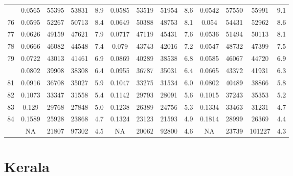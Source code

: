 \documentclass[
  14pt,
]{article}
\begin{document}
\begin{longtable}[t]{lcccccccccccc}
\addlinespace
75 & 0.0565 & 55395 & 53831 & 8.9 & 0.0585 & 53519 & 51954 & 8.6 & 0.0542 & 57550 & 55991 & 9.1\\
76 & 0.0595 & 52267 & 50713 & 8.4 & 0.0649 & 50388 & 48753 & 8.1 & 0.054 & 54431 & 52962 & 8.6\\
77 & 0.0626 & 49159 & 47621 & 7.9 & 0.0717 & 47119 & 45431 & 7.6 & 0.0536 & 51494 & 50113 & 8.1\\
78 & 0.0666 & 46082 & 44548 & 7.4 & 0.079 & 43743 & 42016 & 7.2 & 0.0547 & 48732 & 47399 & 7.5\\
79 & 0.0722 & 43013 & 41461 & 6.9 & 0.0869 & 40289 & 38538 & 6.8 & 0.0585 & 46067 & 44720 & 6.9\\
\addlinespace
80 & 0.0802 & 39908 & 38308 & 6.4 & 0.0955 & 36787 & 35031 & 6.4 & 0.0665 & 43372 & 41931 & 6.3\\
81 & 0.0916 & 36708 & 35027 & 5.9 & 0.1047 & 33275 & 31534 & 6.0 & 0.0802 & 40489 & 38866 & 5.8\\
82 & 0.1073 & 33347 & 31558 & 5.4 & 0.1142 & 29793 & 28091 & 5.6 & 0.1015 & 37243 & 35353 & 5.2\\
83 & 0.129 & 29768 & 27848 & 5.0 & 0.1238 & 26389 & 24756 & 5.3 & 0.1334 & 33463 & 31231 & 4.7\\
84 & 0.1589 & 25928 & 23868 & 4.7 & 0.1324 & 23123 & 21593 & 4.9 & 0.1814 & 28999 & 26369 & 4.4\\
\addlinespace
85 & NA & 21807 & 97302 & 4.5 & NA & 20062 & 92800 & 4.6 & NA & 23739 & 101227 & 4.3\\*
\end{longtable}

\pagebreak

\hypertarget{kerala}{%
\section{Kerala}\label{kerala}}
\end{document}
